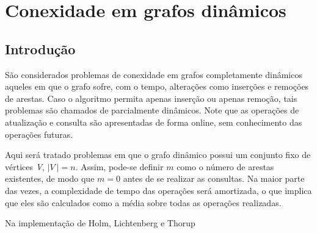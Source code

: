 
\chapter{Conexidade em grafos dinâmicos}

\section{Introdução}

São considerados problemas de conexidade em grafos completamente dinâmicos aqueles em que o grafo sofre, com o tempo, alterações como inserções e remoções 
de arestas. Caso o algoritmo permita apenas inserção ou apenas remoção, tais 
problemas são chamados de parcialmente dinâmicos. Note que as operações de 
atualização e consulta são apresentadas de forma online, sem conhecimento das  operações futuras. 

Aqui será tratado problemas em que o grafo dinâmico possui um conjunto fixo de vértices \textit{V}, $|\textit{V}\ | = n$. Assim, pode-se definir $m$ como o número de arestas existentes, de modo que $m = 0$ antes de se realizar as consultas. Na maior parte das vezes, a complexidade de tempo das operações será amortizada, o que implica que eles são calculados como a média sobre todas as operações realizadas. 

Na implementação de Holm, Lichtenberg e Thorup \cite{test}  






